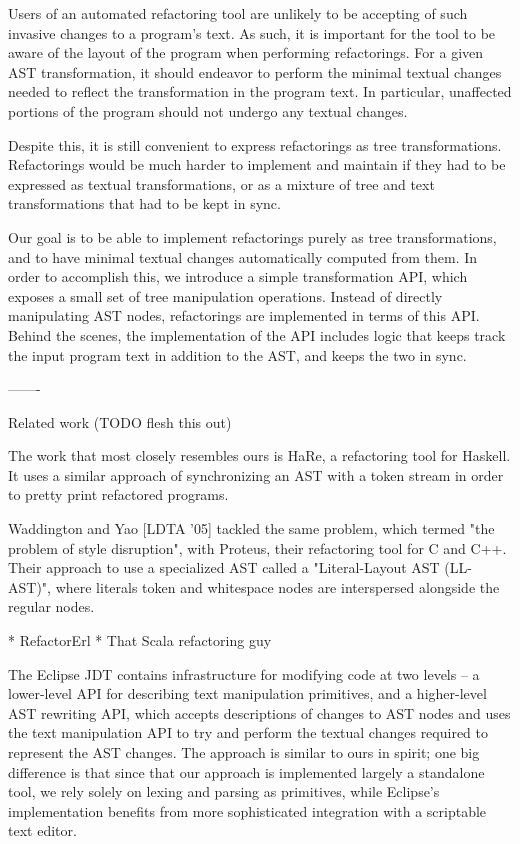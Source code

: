 Users of an automated refactoring tool are unlikely to be accepting of such invasive
changes to a program's text. As such, it is important for the tool to be aware of
the layout of the program when performing refactorings. For a given AST
transformation, it should endeavor to perform the minimal textual changes needed
to reflect the transformation in the program text. In particular, unaffected
portions of the program should not undergo any textual changes.

Despite this, it is still convenient to express refactorings as tree
transformations. Refactorings would be much harder to implement and maintain if
they had to be expressed as textual transformations, or as a mixture of tree and
text transformations that had to be kept in sync.

Our goal is to be able to implement refactorings purely as tree transformations,
and to have minimal textual changes automatically computed from them. In order
to accomplish this, we introduce a simple transformation API, which exposes a
small set of tree manipulation operations. Instead of directly manipulating AST
nodes, refactorings are implemented in terms of this API. Behind the scenes, the
implementation of the API includes logic that keeps track the input program text
in addition to the AST, and keeps the two in sync.

-------

Related work (TODO flesh this out)

The work that most closely resembles ours is HaRe, a refactoring tool for Haskell.
It uses a similar approach of synchronizing an AST with a token stream in order
to pretty print refactored programs.

Waddington and Yao [LDTA '05] tackled the same problem, which termed "the problem
of style disruption", with Proteus, their refactoring tool for C and C++. Their
approach to use a specialized AST called a "Literal-Layout AST (LL-AST)", where
literals token and whitespace nodes are interspersed alongside the regular nodes.

* RefactorErl
* That Scala refactoring guy

The Eclipse JDT contains infrastructure for modifying code at two levels --
a lower-level API for describing text manipulation primitives, and a higher-level
AST rewriting API, which accepts descriptions of changes to AST nodes and uses the
text manipulation API to try and perform the textual changes required to represent
the AST changes. The approach is similar to ours in spirit; one big difference is
that since that our approach is implemented largely a standalone tool, we rely
solely on lexing and parsing as primitives, while Eclipse's implementation
benefits from more sophisticated integration with a scriptable text editor.

